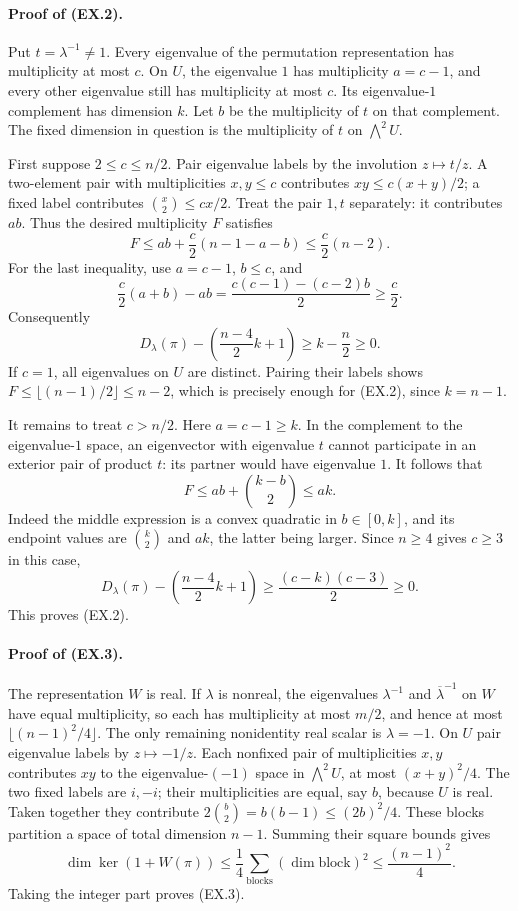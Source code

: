 \paragraph{Proof of (EX.2).}
Put $t=\lambda^{-1}\ne1$.  Every eigenvalue of the permutation
representation has multiplicity at most $c$.  On $U$, the eigenvalue
$1$ has multiplicity $a=c-1$, and every other eigenvalue still has
multiplicity at most $c$.  Its eigenvalue-$1$ complement has dimension
$k$.  Let $b$ be the multiplicity of $t$ on that complement.
The fixed dimension in question is the multiplicity of $t$ on
$\bigwedge^2U$.

First suppose $2\le c\le n/2$.  Pair eigenvalue labels by the
involution $z\mapsto t/z$.  A two-element pair with multiplicities
$x,y\le c$ contributes $xy\le c(x+y)/2$; a fixed label contributes
$\binom{x}{2}\le cx/2$.  Treat the pair $1,t$ separately: it contributes
$ab$.  Thus the desired multiplicity $F$ satisfies
\[
 F\le ab+\frac c2(n-1-a-b)
   \le\frac c2(n-2).
\]
For the last inequality, use $a=c-1$, $b\le c$, and
\[
 \frac c2(a+b)-ab
       =\frac{c(c-1)-(c-2)b}{2}\ge\frac c2.
\]
Consequently
\[
 D_\lambda(\pi)-\left(\frac{n-4}{2}k+1\right)
       \ge k-\frac n2\ge0.
\]
If $c=1$, all eigenvalues on $U$ are distinct.  Pairing their labels
shows $F\le\lfloor(n-1)/2\rfloor\le n-2$, which is precisely enough
for (EX.2), since $k=n-1$.

It remains to treat $c>n/2$.  Here $a=c-1\ge k$.  In the complement
to the eigenvalue-$1$ space, an eigenvector with eigenvalue $t$ cannot
participate in an exterior pair of product $t$: its partner would
have eigenvalue $1$.  It follows that
\[
 F\le ab+\binom{k-b}{2}\le ak.
\]
Indeed the middle expression is a convex quadratic in $b\in[0,k]$,
and its endpoint values are $\binom k2$ and $ak$, the latter being
larger.  Since $n\ge4$ gives $c\ge3$ in this case,
\[
 D_\lambda(\pi)-\left(\frac{n-4}{2}k+1\right)
  \ge \frac{(c-k)(c-3)}2\ge0.
\]
This proves (EX.2).

\paragraph{Proof of (EX.3).}
The representation $W$ is real.  If $\lambda$ is nonreal, the
eigenvalues $\lambda^{-1}$ and $\overline\lambda^{-1}$ on $W$ have
equal multiplicity, so each has multiplicity at most $m/2$, and hence
at most $\lfloor(n-1)^2/4\rfloor$.
The only remaining nonidentity real scalar is $\lambda=-1$.
On $U$ pair eigenvalue labels by $z\mapsto-1/z$.
Each nonfixed pair of multiplicities $x,y$ contributes $xy$ to
the eigenvalue-$(-1)$ space in $\bigwedge^2U$, at most
$(x+y)^2/4$.  The two fixed labels are $i,-i$; their multiplicities
are equal, say $b$, because $U$ is real.  Taken together they
contribute $2\binom b2=b(b-1)\le(2b)^2/4$.
These blocks partition a space of total dimension $n-1$.
Summing their square bounds gives
\[
 \dim\ker(1+W(\pi))
       \le\frac14\sum_{\text{blocks}}(\dim\text{block})^2
       \le\frac{(n-1)^2}{4}.
\]
Taking the integer part proves (EX.3).

